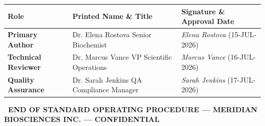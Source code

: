 \documentclass[10pt,a4paper]{article}
\begin{document}
\begin{table}[h!]
  \centering
  \scriptsize
  \renewcommand{\arraystretch}{1.35}
  \begin{tabularx}{\textwidth}{|Y|Y|Y|}
    \hline
    \color{white}\textbf{Role} & \color{white}\textbf{Printed Name \& Title} & \color{white}\textbf{Signature \& Approval Date} \\ \hline
    \textbf{Primary Author} & Dr. Elena Rostova \newline Senior Biochemist & \textit{Elena Rostova} \quad (15-JUL-2026) \\ \hline
    \textbf{Technical Reviewer} & Dr. Marcus Vance \newline VP Scientific Operations & \textit{Marcus Vance} \quad (16-JUL-2026) \\ \hline
    \textbf{Quality Assurance} & Dr. Sarah Jenkins \newline QA Compliance Manager & \textit{Sarah Jenkins} \quad (17-JUL-2026) \\ \hline
  \end{tabularx}
\end{table}

\vspace{6pt}

\begin{tcolorbox}[sopheader]
  \centering
  \scriptsize\textbf{\faLock\ END OF STANDARD OPERATING PROCEDURE --- MERIDIAN BIOSCIENCES INC. --- CONFIDENTIAL}
\end{tcolorbox}
\end{document}
